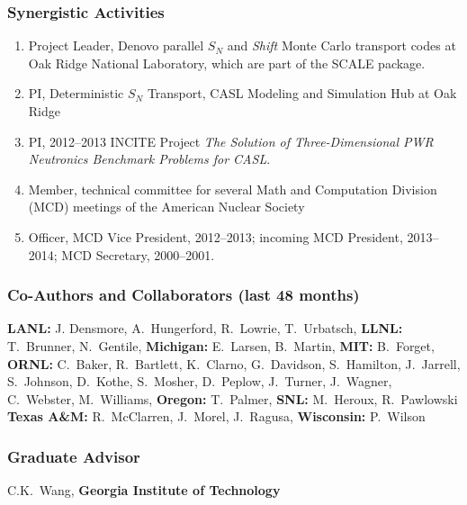 
\vspace*{-3ex}
\subsubsection*{Synergistic Activities}
\vspace{-1ex}
%
\begin{enumerate}
\parskip = -2pt
\item Project Leader, Denovo parallel $S_N$ and {\em Shift} Monte Carlo
  transport codes at Oak Ridge National Laboratory, which are part of the
  SCALE package.
\item PI, Deterministic $S_N$ Transport, CASL Modeling and Simulation Hub at
  Oak Ridge
\item PI, 2012--2013 INCITE Project {\em The Solution of Three-Dimensional PWR
    Neutronics Benchmark Problems for CASL}.
\item Member, technical committee for several Math and Computation Division
  (MCD) meetings of the American Nuclear Society 
\item Officer, MCD Vice President, 2012--2013; incoming MCD President,
  2013--2014; MCD Secretary, 2000--2001.
\end{enumerate}


\vspace*{-3ex}
\subsubsection*{Co-Authors and Collaborators (last 48 months)}
\vspace{-1ex}

{\bf LANL:}  J. Densmore, A.~Hungerford, R.~Lowrie, T.~Urbatsch,
{\bf LLNL:} T.~Brunner, N.~Gentile, 
{\bf Michigan:}  E.~Larsen, B.~Martin, 
{\bf MIT:} B.~Forget,
{\bf ORNL:} C.~Baker, R.~Bartlett, K.~Clarno, G.~Davidson, S.~Hamilton,
J.~Jarrell, S.~Johnson, D.~Kothe, S.~Mosher, D.~Peplow, J.~Turner, J.~Wagner,
C.~Webster, M.~Williams,
{\bf Oregon:} T.~Palmer,
{\bf SNL:} M.~Heroux, R.~Pawlowski
{\bf Texas A\&M:} R.~McClarren, J.~Morel, J.~Ragusa, 
{\bf Wisconsin:}  P.~Wilson

\vspace*{-2ex}
\subsubsection*{Graduate Advisor}
\vspace{-1ex}
C.K.~Wang, {\bf Georgia Institute of Technology}

